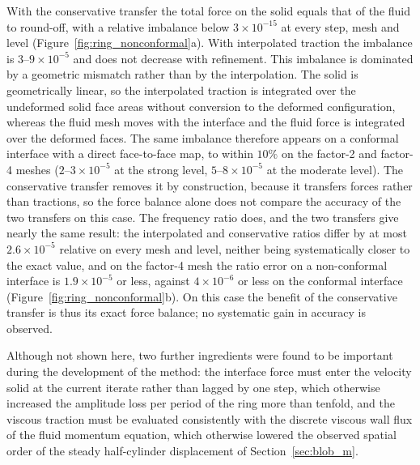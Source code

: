 With the conservative transfer the total force on the solid equals that of the fluid to round-off, with a relative imbalance below $3\times10^{-15}$ at every step, mesh and level (Figure~\ref{fig:ring_nonconformal}a).
With interpolated traction the imbalance is $3$--$9\times10^{-5}$ and does not decrease with refinement.
This imbalance is dominated by a geometric mismatch rather than by the interpolation.
The solid is geometrically linear, so the interpolated traction is integrated over the undeformed solid face areas without conversion to the deformed configuration, whereas the fluid mesh moves with the interface and the fluid force is integrated over the deformed faces.
The same imbalance therefore appears on a conformal interface with a direct face-to-face map, to within $10\%$ on the factor-2 and factor-4 meshes ($2$--$3\times10^{-5}$ at the strong level, $5$--$8\times10^{-5}$ at the moderate level).
The conservative transfer removes it by construction, because it transfers forces rather than tractions, so the force balance alone does not compare the accuracy of the two transfers on this case.
The frequency ratio does, and the two transfers give nearly the same result: the interpolated and conservative ratios differ by at most $2.6\times10^{-5}$ relative on every mesh and level, neither being systematically closer to the exact value, and on the factor-4 mesh the ratio error on a non-conformal interface is $1.9\times10^{-5}$ or less, against $4\times10^{-6}$ or less on the conformal interface (Figure~\ref{fig:ring_nonconformal}b).
On this case the benefit of the conservative transfer is thus its exact force balance; no systematic gain in accuracy is observed.

Although not shown here, two further ingredients were found to be important during the development of the method: the interface force must enter the velocity solid at the current iterate rather than lagged by one step, which otherwise increased the amplitude loss per period of the ring more than tenfold, and the viscous traction must be evaluated consistently with the discrete viscous wall flux of the fluid momentum equation, which otherwise lowered the observed spatial order of the steady half-cylinder displacement of Section~\ref{sec:blob_m}.
